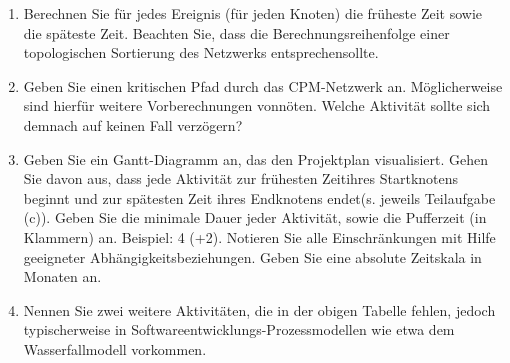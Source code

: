 \documentclass{bschlangaul-aufgabe}
\begin{document}
\begin{enumerate}

\item Berechnen Sie für jedes Ereignis (\dh für jeden Knoten) die
früheste Zeit sowie die späteste Zeit. Beachten Sie, dass die
Berechnungsreihenfolge einer topologischen Sortierung des Netzwerks
entsprechensollte.


\item Geben Sie einen kritischen Pfad durch das CPM-Netzwerk an.
Möglicherweise sind hierfür weitere Vorberechnungen vonnöten. Welche
Aktivität sollte sich demnach auf keinen Fall verzögern?


\item Geben Sie ein Gantt-Diagramm an, das den Projektplan visualisiert.
Gehen Sie davon aus, dass jede Aktivität zur frühesten Zeitihres
Startknotens beginnt und zur spätesten Zeit ihres Endknotens endet(s.
jeweils Teilaufgabe (c)). Geben Sie die minimale Dauer jeder Aktivität,
sowie die Pufferzeit (in Klammern) an. Beispiel: 4 (+2). Notieren Sie
alle Einschränkungen mit Hilfe geeigneter Abhängigkeitsbeziehungen.
Geben Sie eine absolute Zeitskala in Monaten an.


\item Nennen Sie zwei weitere Aktivitäten, die in der obigen Tabelle
fehlen, jedoch typischerweise in Softwareentwicklungs-Prozessmodellen
wie etwa dem Wasserfallmodell vorkommen.
\end{enumerate}
\end{document}
